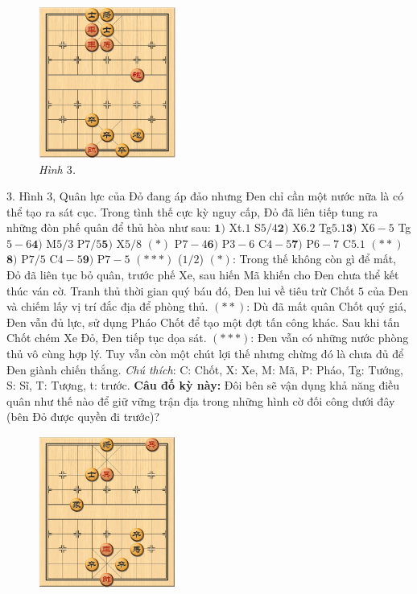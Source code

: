 \begin{multicols}{2}
	\begin{figure}[H]
		\vspace*{-5pt}
		\centering
		\captionsetup{labelformat= empty, justification=centering}
		\includegraphics[width= 0.4\textwidth]{3}
		\caption{\small\textit{\color{gocco}Hình $3$.}}
		\vspace*{-10pt}
	\end{figure}
	$3.$ Hình $3$, Quân lực của Đỏ đang áp đảo nhưng Đen chỉ cần một nước nữa là có thể tạo ra sát cục. Trong tình thế cực kỳ nguy cấp, Đỏ đã liên tiếp tung ra những đòn phế quân để thủ hòa như sau:
	\vskip 0.1cm
	$\pmb{1)}$ Xt$.1$ S$5/4$\quad $\pmb{2)}$ X$6.2$ Tg$5.1$\quad $\pmb{3)}$ X$6-5$ Tg$5-6$\quad $\pmb{4)}$ M$5/3$ P$7/5$\quad $\pmb{5)}$ X$5/8$ $(*)$ P$7-4$\quad $\pmb{6)}$ P$3-6$ C$4-5$\quad $\pmb{7)}$ P$6-7$ C$5.1$ $(**)$\quad $\pmb{8)}$ P$7/5$ C$4-5$\quad $\pmb{9)}$ P$7-5$ $(***)$ ($1/2$)
	\vskip 0.1cm
	$(*)$: Trong thế không còn gì để mất, Đỏ đã liên tục bỏ quân, trước phế Xe, sau hiến Mã khiến cho Đen chưa thể kết thúc ván cờ. Tranh thủ thời gian quý báu đó, Đen lui về tiêu trừ Chốt $5$ của Đen và chiếm lấy vị trí đắc địa để phòng thủ.
	\vskip 0.1cm
	$(**)$: Dù đã mất quân Chốt quý giá, Đen vẫn đủ lực, sử dụng Pháo Chốt để tạo một đợt tấn công khác. Sau khi tấn Chốt chém Xe Đỏ, Đen tiếp tục dọa sát.
	\vskip 0.1cm
	$(***)$: Đen vẫn có những nước phòng thủ vô cùng hợp lý. Tuy vẫn còn một chút lợi thế nhưng chừng đó là chưa đủ để Đen giành chiến thắng.
	\vskip 0.1cm
	\textit{Chú thích}: C: Chốt, X: Xe, M: Mã, P: Pháo, Tg: Tướng, S: Sĩ, T: Tượng, t: trước.
	\vskip 0.1cm
	\textbf{\color{gocco}Câu đố kỳ này:}  Đôi bên sẽ vận dụng khả năng điều quân như thế nào để giữ vững trận địa trong những hình cờ đối công dưới đây (bên Đỏ được quyền đi trước)?
	\begin{figure}[H]
		\vspace*{-5pt}
		\centering
		\captionsetup{labelformat= empty, justification=centering}
		\includegraphics[width= 0.4\textwidth]{4}

\end{figure}
\end{multicols}
